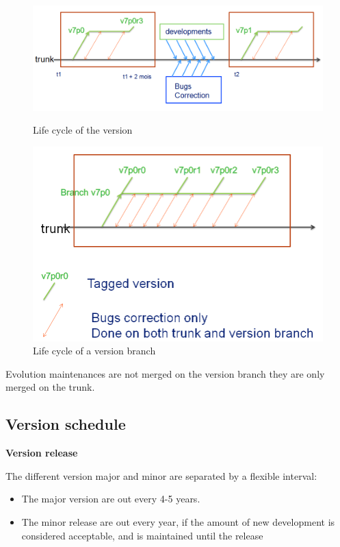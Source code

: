 \begin{figure}[H]
\centering
\includegraphics[scale=.4]{graphics/lifecycle.png}
\label{fig_lifecycle}
\caption{Life cycle of the \telemacsystem version}
\end{figure}

\begin{figure}[H]
\centering
\includegraphics[scale=.4]{graphics/minor_version.png}
\caption{\label{minor_version} Life cycle of a version branch}
\end{figure}


Evolution maintenances are not merged on the version branch they are only
merged on the trunk.

\subsection{Version schedule}

\textbf{Version release}

The different version major and minor are separated by a flexible interval:
\begin{itemize}
\item The major version are out every 4-5 years.
\item The minor release are out every year, if the amount of new development is considered acceptable, and is maintained until the release
\end{itemize}

